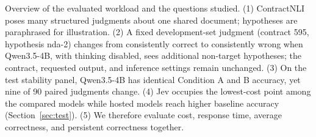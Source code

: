 Overview of the evaluated workload and the questions studied. (1) ContractNLI poses many structured judgments about one shared document; hypotheses are paraphrased for illustration. (2) A fixed development-set judgment (contract 595, hypothesis nda-2) changes from consistently correct to consistently wrong when Qwen3.5-4B, with thinking disabled, sees additional non-target hypotheses; the contract, requested output, and inference settings remain unchanged. (3) On the test stability panel, Qwen3.5-4B has identical Condition A and B accuracy, yet nine of 90 paired judgments change. (4) Jev occupies the lowest-cost point among the compared models while hosted models reach higher baseline accuracy (Section~\ref{sec:test}). (5) We therefore evaluate cost, response time, average correctness, and persistent correctness together.
